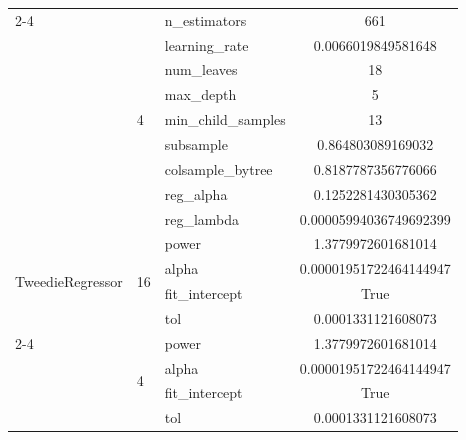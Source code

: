 \begin{table}[p]
{\begin{tabular}{lllc}
    \cmidrule(l){2-4}
    & \multirow{9}{*}{\num{4}} & n\_estimators & \num{661} \\
    & & learning\_rate & \num{0.0066019849581648} \\
    & & num\_leaves & \num{18} \\
    & & max\_depth & \num{5} \\
    & & min\_child\_samples & \num{13} \\
    & & subsample & \num{0.864803089169032} \\
    & & colsample\_bytree & \num{0.8187787356776066} \\
    & & reg\_alpha & \num{0.1252281430305362} \\
    & & reg\_lambda & \num{0.00005994036749692399} \\
    \midrule
    \multirow{4}{*}{TweedieRegressor} & \multirow{4}{*}{\num{16}} & power & \num{1.3779972601681014} \\
    & & alpha & \num{0.00001951722464144947} \\
    & & fit\_intercept & True \\
    & & tol & \num{0.0001331121608073} \\
    \cmidrule(l){2-4}
    & \multirow{4}{*}{\num{4}} & power & \num{1.3779972601681014} \\
    & & alpha & \num{0.00001951722464144947} \\
    & & fit\_intercept & True \\
    & & tol & \num{0.0001331121608073} \\
    \bottomrule
    \end{tabular}
    }
\end{table}


